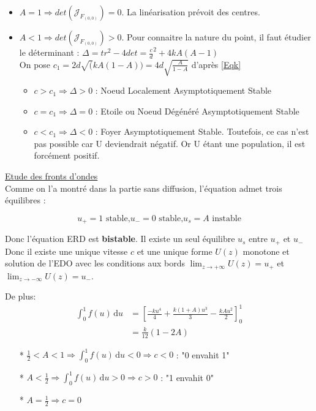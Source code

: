 \documentclass[a4paper,11pt]{article}
\begin{document}
\begin{itemize}[label=$\bullet$]
\begin{itemize}
        \begin{itemize}[label=$\blacktriangleright$]
            \item $A=1 \Rightarrow det (\mathcal{J}_{F_{(0,0)}})=0$. La linéarisation prévoit des centres.
            \item $A<1 \Rightarrow det (\mathcal{J}_{F_{(0,0)}})>0$. Pour connaitre la nature du point, il faut étudier le déterminant : $\Delta = tr^2 -4 det= \frac{c}{d}^2+4kA(A-1)$\\
            On pose $c_1=2d\sqrt(kA(1-A))=4d\sqrt{\frac{A}{1-A}}$ d'après \eqref{Eqk}
            \begin{itemize}[label=$\rightarrow$]
				\item $c>c_1 \Rightarrow \Delta >0$ : Noeud Localement Asymptotiquement Stable
                \item $c=c_1 \Rightarrow \Delta =0$ : Etoile ou Noeud Dégénéré Asymptotiquement Stable
                \item $c<c_1 \Rightarrow \Delta <0$ : Foyer Asymptotiquement Stable. Toutefois, ce cas n'est pas possible car U deviendrait négatif. Or U étant une population, il est forcément positif.
			\end{itemize}
		\end{itemize}
	\end{itemize}
\end{itemize}

\noindent \underline{Etude des fronts d'ondes}\\
Comme on l'a montré dans la partie sans diffusion, l'équation admet trois équilibres :

$$u_+=1 \text{ stable,} u_-=0 \text{ stable,} u_s=A \text{ instable}$$
	
    Donc l'équation ERD est \textbf{bistable}. Il existe un seul équilibre $u_s$ entre $u_+$ et $u_-$ \\
    Donc il existe une unique vitesse $c$ et une unique forme $U(z)$ monotone et solution de l'EDO avec les conditions aux bords $\lim_{z \to +\infty} U(z)=u_+$ et $\lim_{z \to -\infty} U(z)=u_-$. 
    
    De plus: 
	\begin{align*}
		\int_{0}^1 f(u)\, \mathrm{d}u &=\left[\frac{-ku^4}{4}+\frac{k(1+A)u^3}{3}-\frac{kAu^2}{2}\right]_0^1\\
		&=\frac{k}{12}(1-2A)
	\end{align*}
    	\begin{itemize}
        	\item[*] $\frac{1}{2}<A<1 \Rightarrow \int_{0}^1 f(u)\, \mathrm{d}u<0 \Rightarrow c<0$ : "0 envahit 1"
            \item[*] $A<\frac{1}{2} \Rightarrow \int_{0}^1 f(u)\, \mathrm{d}u>0 \Rightarrow c>0$ : "1 envahit 0"
            \item[*] $A=\frac{1}{2} \Rightarrow c=0$
		\end{itemize}
\end{document}
